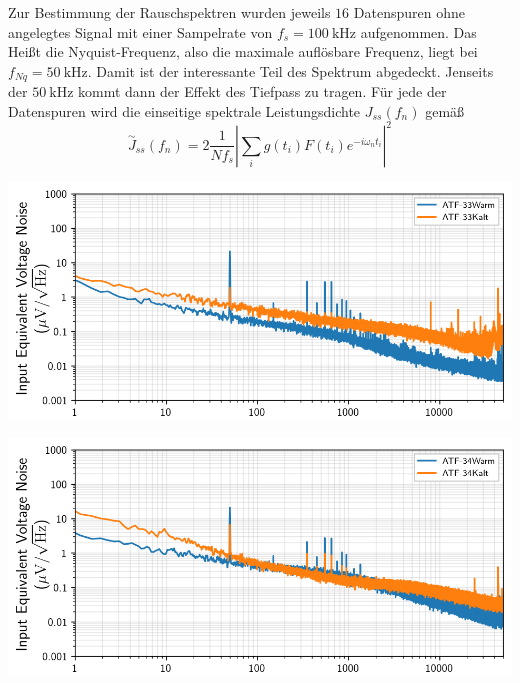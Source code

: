 Zur Bestimmung der Rauschspektren wurden jeweils $16$ Datenspuren ohne angelegtes Signal mit einer Sampelrate von $f_s = \SI{100}{\kilo\hertz}$ aufgenommen.
Das Heißt die Nyquist-Frequenz, also die maximale auflösbare Frequenz, liegt bei $f_{Nq}=\SI{50}{\kilo\hertz}$.
Damit ist der interessante Teil des Spektrum abgedeckt.
Jenseits der $\SI{50}{\kilo\hertz}$ kommt dann der Effekt des Tiefpass zu tragen.
Für jede der Datenspuren wird die einseitige spektrale Leistungsdichte $J_{ss}(f_n)$ gemäß
\begin{equation}
\stackrel{\sim}{J}_{ss}(f_n) = 2 \frac{1}{N f_s}\left|\sum_i g(t_i)F(t_i)e^{-i\omega_n t_i}\right|^2
\end{equation}

\begin{minipage}[!c]{\textwidth}

\begin{minipage}[c]{\textwidth}
\includegraphics[width=\textwidth]{./fig/Rauschen/F33Warm.pdf}
\vspace{-0.45cm}
\label{subfig:33}
\end{minipage}

\begin{minipage}[c]{\textwidth}
\includegraphics[width=\textwidth]{./fig/Rauschen/F34Warm.pdf}
\vspace{-0.45cm}
\label{subfig:33}
\end{minipage}


\end{minipage}
